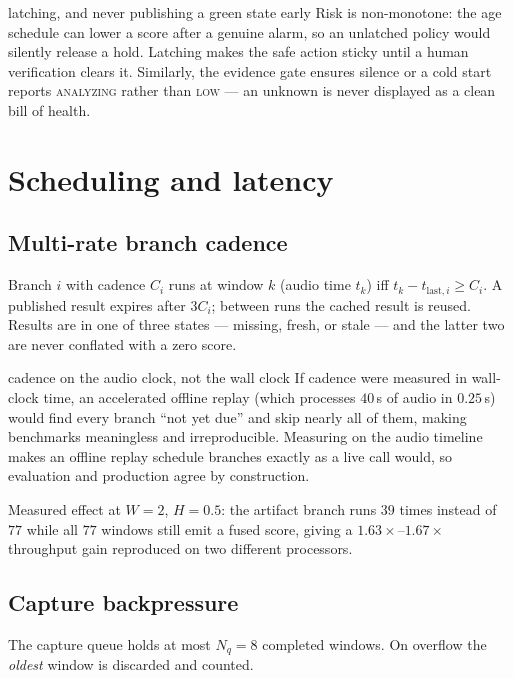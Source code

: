 \documentclass[11pt,a4paper]{article}
\begin{document}
\begin{whybox}{latching, and never publishing a green state early}
Risk is non-monotone: the age schedule can lower a score after a genuine alarm, so an
unlatched policy would silently release a hold. Latching makes the safe action sticky
until a human verification clears it. Similarly, the evidence gate ensures silence or a
cold start reports \textsc{analyzing} rather than \textsc{low} --- an unknown is never
displayed as a clean bill of health.
\end{whybox}

\section{Scheduling and latency}

\subsection{Multi-rate branch cadence}

Branch $i$ with cadence $C_i$ runs at window $k$ (audio time $t_k$) iff
$t_k - t_{\text{last},i} \ge C_i$. A published result expires after $3C_i$; between runs
the cached result is reused. Results are in one of three states --- missing, fresh, or
stale --- and the latter two are never conflated with a zero score.

\begin{whybox}{cadence on the audio clock, not the wall clock}
If cadence were measured in wall-clock time, an accelerated offline replay (which
processes $40$\,s of audio in $0.25$\,s) would find every branch ``not yet due'' and skip
nearly all of them, making benchmarks meaningless and irreproducible. Measuring on the
audio timeline makes an offline replay schedule branches exactly as a live call would,
so evaluation and production agree by construction.
\end{whybox}

Measured effect at $W=2$, $H=0.5$: the artifact branch runs $39$ times instead of $77$
while all $77$ windows still emit a fused score, giving a $1.63\times$--$1.67\times$
throughput gain reproduced on two different processors.

\subsection{Capture backpressure}

The capture queue holds at most $N_q = 8$ completed windows. On overflow the
\emph{oldest} window is discarded and counted.
\end{document}
